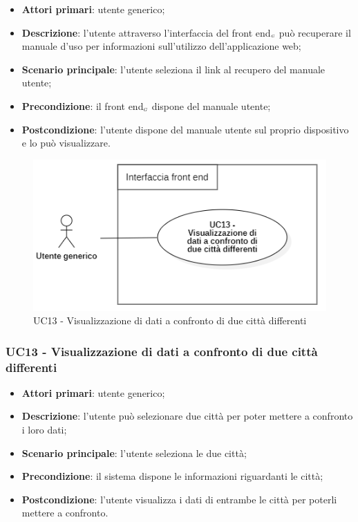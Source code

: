 \begin{itemize}
	\item \textbf{Attori primari}: utente generico;
	\item \textbf{Descrizione}: l'utente attraverso l'interfaccia del front end$_{\scaleto{G}{3pt}}$ può recuperare il manuale d'uso per informazioni sull'utilizzo dell'applicazione web;
	\item \textbf{Scenario principale}: l'utente seleziona il link al recupero del manuale utente;
	\item \textbf{Precondizione}: il front end$_{\scaleto{G}{3pt}}$ dispone del manuale utente;
	\item \textbf{Postcondizione}: l'utente dispone del manuale utente sul proprio dispositivo e lo può visualizzare.
\end{itemize}


\begin{center}
	\begin{figure}[H]
		\centering\includegraphics[scale=0.7]{../immagini/attori_casi/uc13.png}
		\caption{UC13 - Visualizzazione di dati a confronto di due città differenti}
	\end{figure}
\end{center}


\subsubsection{UC13 - Visualizzazione di dati a confronto di due città differenti}\label{CasiDUsoCasiDUsoFacoltativiTraUnUtenteEIlFrontEndElencoCasiDUsoUC13VisualizzazioneDiDatiAConfrontoDiDueCittaDifferenti}

\begin{itemize}
	\item \textbf{Attori primari}: utente generico;
	\item \textbf{Descrizione}: l’utente può selezionare due città per poter mettere a confronto i loro dati;
	\item \textbf{Scenario principale}: l’utente seleziona le due città;
	\item \textbf{Precondizione}: il sistema dispone le informazioni riguardanti le città;
	\item \textbf{Postcondizione}: l'utente visualizza i dati di entrambe le città per poterli mettere a confronto.
\end{itemize}



